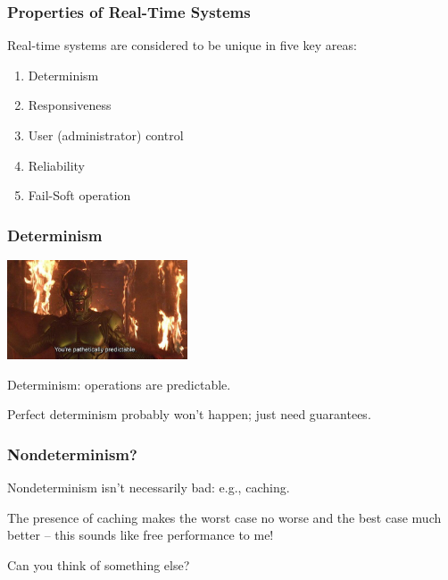 \begin{frame}
\frametitle{Properties of Real-Time Systems}

Real-time systems are considered to be unique in five key areas:

\begin{enumerate}
	\item Determinism
	\item Responsiveness
	\item User (administrator) control
	\item Reliability
	\item Fail-Soft operation
\end{enumerate}


\end{frame}

\begin{frame}
\frametitle{Determinism}

\begin{center}
	\includegraphics[width=0.4\textwidth]{images/predictable.jpg}
\end{center}

Determinism: operations are predictable.

Perfect determinism probably won't happen; just need guarantees.

\end{frame}

\begin{frame}
\frametitle{Nondeterminism?}

Nondeterminism isn't necessarily bad: e.g., caching.

The presence of caching makes the worst case no worse and the best case much better -- this sounds like free performance to me! 

Can you think of something else?

\end{frame}

